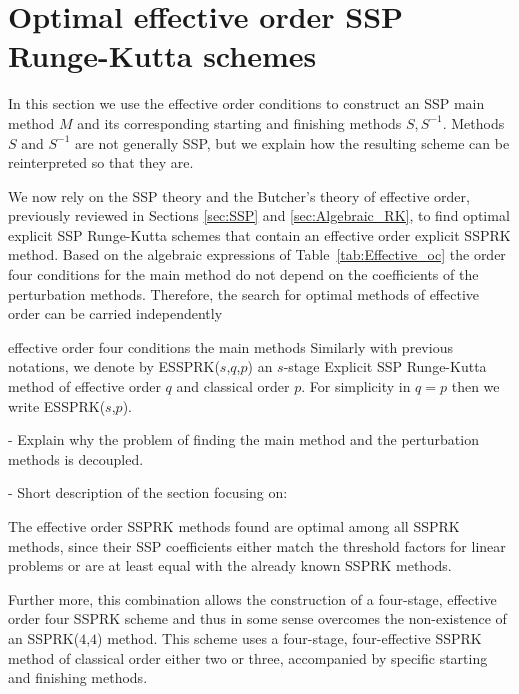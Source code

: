 \section{Optimal effective order SSP Runge-Kutta schemes}\label{sec:Optimal_ESSPRK}
In this section we use the effective order conditions to
construct an SSP main method $M$ and its corresponding starting and finishing
methods $S,S^{-1}$.  Methods $S$ and $S^{-1}$ are not generally SSP, but we
explain how the resulting scheme can be reinterpreted so that they are.

We now rely on the SSP theory and the Butcher's theory of effective order, previously reviewed in Sections \ref{sec:SSP} and \ref{sec:Algebraic_RK}, to find optimal explicit SSP Runge-Kutta schemes that contain an effective order explicit SSPRK method. Based on the algebraic expressions of Table~\ref{tab:Effective_oc} the order four conditions for the main method do not depend on the coefficients of the perturbation methods. Therefore, the search for optimal methods of effective order can be carried independently 


effective order four conditions the main methods Similarly with previous notations, we denote by ESSPRK($s$,$q$,$p$) an $s$-stage Explicit SSP Runge-Kutta method of effective order $q$ and classical order $p$. For simplicity in $q=p$ then we write ESSPRK($s$,$p$). 

- Explain why the problem of finding the main method and the perturbation methods is decoupled.

- Short description of the section focusing on: 







The effective order SSPRK methods found are optimal among all SSPRK methods, since their SSP coefficients either match the threshold factors for linear problems  or are at least equal with the already known SSPRK methods. 


Further more, this combination allows the construction of a
four-stage, effective order four SSPRK scheme and thus in some sense overcomes the
non-existence of an SSPRK(\( 4 \),\( 4 \)) method.  This scheme uses a
four-stage, four-effective SSPRK method of classical order either two
or three, accompanied by specific starting and finishing methods.

